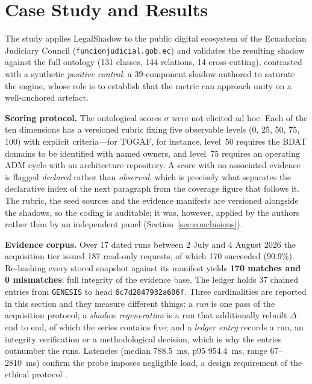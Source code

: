 \documentclass[engproc,proceedingpaper,submit,moreauthors]{Definitions/mdpi}
\begin{document}
\section{Case Study and Results}
\label{sec:results}

The study applies LegalShadow to the public digital ecosystem of the Ecuadorian Judiciary Council (\texttt{funcionjudicial\-.gob\-.ec}) and validates the resulting shadow against the full ontology (131 classes, 144 relations, 14 cross-cutting), contrasted with a synthetic \emph{positive control}: a 39-component shadow authored to saturate the engine, whose role is to establish that the metric can approach unity on a well-anchored artefact.

\textbf{Scoring protocol.} The ontological scores $\sigma$ were not elicited ad hoc. Each of the ten dimensions has a versioned rubric fixing five observable levels (0, 25, 50, 75, 100) with explicit criteria---for TOGAF, for instance, level~50 requires the BDAT domains to be identified with named owners, and level~75 requires an operating ADM cycle with an architecture repository. A score with no associated evidence is flagged \emph{declared} rather than \emph{observed}, which is precisely what separates the declarative index of the next paragraph from the coverage figure that follows it. The rubric, the seed sources and the evidence manifests are versioned alongside the shadows, so the coding is auditable; it was, however, applied by the authors rather than by an independent panel (Section~\ref{sec:conclusions}).

\textbf{Evidence corpus.} Over 17 dated runs between 2 July and 4 August 2026 the acquisition tier issued 187 read-only requests, of which 170 succeeded (90.9\%). Re-hashing every stored snapshot against its manifest yields \textbf{170 matches and 0 mismatches}: full integrity of the evidence base. The ledger holds 37 chained entries from \texttt{GENESIS} to head \texttt{6c7d2847932a606f}. Three cardinalities are reported in this section and they measure different things: a \emph{run} is one pass of the acquisition protocol; a \emph{shadow regeneration} is a run that additionally rebuilt $\Delta$ end to end, of which the series contains five; and a \emph{ledger entry} records a run, an integrity verification or a methodological decision, which is why the entries outnumber the runs. Latencies (median 788.5~ms, p95 954.4~ms, range 67--2810~ms) confirm the probe imposes negligible load, a design requirement of the ethical protocol \cite{Krotov2020}.
\end{document}
